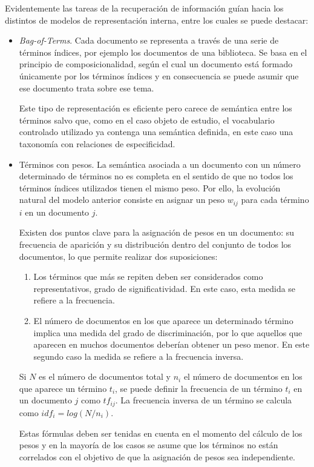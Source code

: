 Evidentemente las tareas de la recuperación de información 
guían hacia los distintos de modelos de representación interna, entre los cuales 
se puede destacar:
\begin{itemize}
 \item \textit{Bag-of-Terms}. Cada documento se representa a través 
de una serie de términos índices, por ejemplo los documentos de una 
biblioteca. Se basa en el principio de composicionalidad, según el cual 
un documento está formado únicamente por los términos índices y en 
consecuencia se puede asumir que ese documento trata sobre ese tema. 

Este tipo de representación es eficiente pero carece de semántica entre 
los términos salvo que, como en el caso objeto de estudio, el vocabulario 
controlado utilizado ya contenga una semántica definida, en este 
caso una taxonomía con relaciones de especificidad.

\item Términos con pesos. La semántica asociada a un documento 
con un número determinado de términos no es completa en el sentido 
de que no todos los términos índices utilizados tienen el mismo peso. Por ello, 
la evolución natural del modelo anterior consiste en asignar un peso $w_{ij}$ para 
cada término $i$ en un documento $j$.

Existen dos puntos clave para la asignación de pesos en un documento: su frecuencia 
de aparición y su distribución dentro del conjunto de todos los documentos, lo que 
permite realizar dos suposiciones:
\begin{enumerate}
 \item Los términos que más se repiten deben ser considerados como representativos, 
grado de significatividad. En este caso, esta medida se refiere a la frecuencia.
 \item El número de documentos en los que aparece un determinado término implica una medida 
del grado de discriminación, por lo que aquellos que aparecen en muchos documentos 
deberían obtener un peso menor. En este segundo caso la medida 
se refiere a la frecuencia inversa.
\end{enumerate}

Si $N$ es el número de documentos total y $n_i$ el número de documentos en los que aparece 
un término $t_i$, se puede definir la frecuencia de un término $t_i$ en un documento 
$j$ como $tf_{ij}$. La frecuencia inversa de un término se calcula como $idf_{i}=log(N/n_{i})$.

Estas fórmulas deben ser tenidas en cuenta en el momento del cálculo de los pesos y en la mayoría 
de los casos se asume que los términos no están correlados con el objetivo de 
que la asignación de pesos sea independiente.

\end{itemize}

